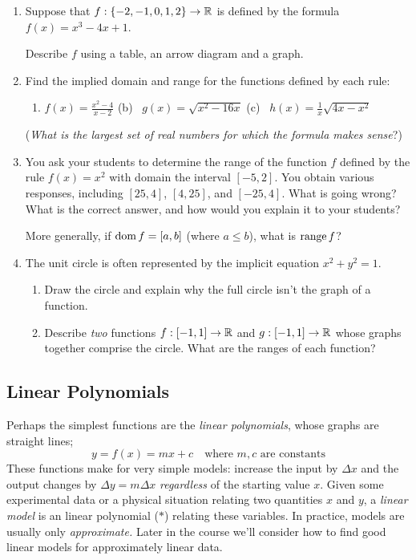 \begin{exercises}{}{}
\begin{enumerate}
	  
	  \item Suppose that $f:\{-2,-1,0,1,2\}\to\mathbb{R}$ is defined by the formula $f(x)=x^3-4x+1$.\par
	  Describe $f$ using a table, an arrow diagram and a graph.
	  
	  
	  \item Find the implied domain and range for the functions defined by each rule:
	  \begin{enumerate}
	    \item $f(x)=\frac{x^2-4}{x-2}$\qquad\qquad
	    (b) \ $g(x)=\sqrt{x^2-16x}$\qquad\qquad
	    (c) \ $h(x)=\frac 1x\sqrt{4x-x^2}$
	  \end{enumerate}
	  (\emph{What is the largest set of real numbers for which the formula makes sense}?)
	  
	  
	  \item You ask your students to determine the range of the function $f$ defined by the rule $f(x)=x^2$ with domain the interval $[-5,2]$. You obtain various responses, including $[25,4]$, $[4,25]$, and $[-25,4]$. What is going wrong? What is the correct answer, and how would you explain it to your students?\par
	  More generally, if $\operatorname{dom} f=[a,b]$ (where $a\le b$), what is $\operatorname{range} f$?
	  
	  
	  \item The unit circle is often represented by the implicit equation $x^2+y^2=1$.
	  \begin{enumerate}
	    \item Draw the circle and explain why the full circle isn't the graph of a function.
	    \item Describe \emph{two} functions $f:[-1,1]\to\mathbb{R}$ and $g:[-1,1]\to\mathbb{R}$ whose graphs together comprise the circle. What are the ranges of each function?
	  \end{enumerate}
	  
	\end{enumerate}
\end{exercises}


\clearpage




\subsection{Linear Polynomials}

Perhaps the simplest functions are the \emph{linear polynomials}, whose graphs are straight lines;
\[
	y=f(x)=mx+c\quad\text{where $m,c$ are constants} \tag{$\ast$}
\]
These functions make for very simple models: increase the input by $\Delta x$ and the output changes by $\Delta y=m\Delta x$ \emph{regardless} of the starting value $x$. Given some experimental data or a physical situation relating two quantities $x$ and $y$, a \emph{linear model} is an linear polynomial ($\ast$) relating these variables. In practice, models are usually only \emph{approximate.} Later in the course we'll consider how to find good linear models for approximately linear data.



